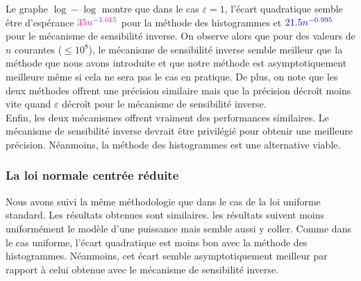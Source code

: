 Le graphe \(\log-\log\) montre que dans le cas \(\varepsilon = 1\), l'écart quadratique semble être d’espérance \(\color{magenta} 35n^{-1.015}\) pour la méthode des histogrammes et \(\color{blue} 21.5n^{-0.995}\) pour le mécanisme de sensibilité inverse. On observe alors que pour des valeurs de \(n\) courantes (\(\leq 10^8\)), le mécanisme de sensibilité inverse semble meilleur que la méthode que nous avons introduite et que notre méthode est asymptotiquement meilleure même si cela ne sera pas le cas en pratique. De plus, on note que les deux méthodes offrent une précision similaire mais que la précision décroît moins vite quand \(\varepsilon\) décroît pour le mécanisme de sensibilité inverse.\\

Enfin, les deux mécanismes offrent vraiment des performances similaires. Le mécanisme de sensibilité inverse devrait être privilégié pour obtenir une meilleure précision. Néanmoins, la méthode des histogrammes est une alternative viable.

\subsubsection{La loi normale centrée réduite}


Nous avons suivi la même méthodologie que dans le cas de la loi uniforme standard. Les résultats obtenues sont similaires. les résultats suivent moins uniformément le modèle d'une puissance mais semble aussi y coller. Comme dans le cas uniforme, l'écart quadratique est moins bon avec la méthode des histogrammes. Néanmoins, cet écart semble asymptotiquement meilleur par rapport à celui obtenue avec le mécanisme de sensibilité inverse. 

